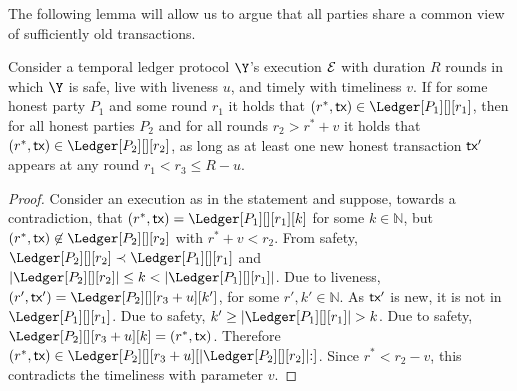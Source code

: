 \appsection[Proofs]

The following lemma will allow us to argue that all parties share a common
view of sufficiently old transactions.

\begin{lemma}\label{lem:past-perfect}
  Consider a temporal ledger protocol $\Y$'s
  execution $\mathcal{E}$ with duration $R$ rounds in which $\Y$ is
  safe, live with liveness $u$, and timely with timeliness $v$.
  If for some honest party $P_1$ and some round $r_1$ it holds that
  $(r^*, \tx) \in \Ledger[P_1][][r_1]$, then
  for all honest parties $P_2$ and for all rounds $r_2 > r^* + v$
  it holds that
  $(r^*, \tx) \in \Ledger[P_2][][r_2]$,
  as long as at least one new honest transaction $\textsf{tx}'$ appears at
  any round $r_1 < r_3 \leq R - u$.
\end{lemma}
\begin{proof}
  Consider an execution as in the statement and suppose, towards a contradiction,
  that $(r^*, \tx) = \Ledger[P_1][][r_1][k]$ for some $k \in \mathbb{N}$,
  but $(r^*, \tx) \not\in \Ledger[P_2][][r_2]$
  with $r^* + v < r_2$.
  From safety,
  $\Ledger[P_2][][r_2] \prec \Ledger[P_1][][r_1]$ and
  $|\Ledger[P_2][][r_2]| \leq k < |\Ledger[P_1][][r_1]|$.
  Due to liveness, $(r', \tx') = \Ledger[P_2][][r_3 + u][k']$,
  for some $r', k' \in \mathbb{N}$.
  As $\textsf{tx}'$ is new, it is not in $\Ledger[P_1][][r_1]$.
  Due to safety, $k' \geq |\Ledger[P_1][][r_1]| > k$.
  Due to safety, $\Ledger[P_2][][r_3 + u][k] = (r^*, \tx)$.
  Therefore
  $(r^*, \tx) \in \Ledger[P_2][][r_3 + u][|\Ledger[P_2][][r_2]|{:}]$.
  Since $r^* < r_2 - v$, this contradicts the timeliness with parameter $v$.\Qed
\end{proof}

